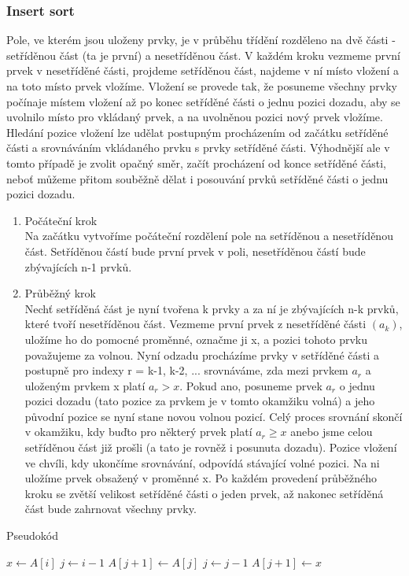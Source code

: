 \documentclass[10pt,a4paper]{article}
\begin{document}
\subsubsection{Insert sort}
Pole, ve kterém jsou uloženy prvky, je v průběhu třídění rozděleno na dvě části - setříděnou část (ta je první) a nesetříděnou část. V každém kroku vezmeme první prvek v nesetříděné části, projdeme setříděnou část, najdeme v ní místo vložení a na toto místo prvek vložíme. Vložení se provede tak, že posuneme všechny prvky počínaje místem vložení až po konec setříděné části o jednu pozici dozadu, aby se uvolnilo místo pro vkládaný prvek, a na uvolněnou pozici nový prvek vložíme. Hledání pozice vložení lze udělat postupným procházením od začátku setříděné části a srovnáváním vkládaného prvku s prvky setříděné části. Výhodnější ale v tomto případě je zvolit opačný směr, začít procházení od konce setříděné části, neboť můžeme přitom souběžně dělat i posouvání prvků setříděné části o jednu pozici dozadu.
\begin{enumerate}
	\item Počáteční krok \\
	Na začátku vytvoříme počáteční rozdělení pole na setříděnou a nesetříděnou část. Setříděnou částí bude první prvek v poli, nesetříděnou částí bude zbývajících n-1 prvků.
	\item Průběžný krok \\
	Nechť setříděná část je nyní tvořena k prvky a za ní je zbývajících n-k prvků, které tvoří nesetříděnou část. Vezmeme první prvek z nesetříděné části $(a_k)$, uložíme ho do pomocné proměnné, označme ji x, a pozici tohoto prvku považujeme za volnou. Nyní odzadu procházíme prvky v setříděné části a postupně pro indexy r = k-1, k-2, ... srovnáváme, zda mezi prvkem $a_r$ a uloženým prvkem x platí $a_r > x$. Pokud ano, posuneme prvek $a_r$ o jednu pozici dozadu (tato pozice za prvkem je v tomto okamžiku volná) a jeho původní pozice se nyní stane novou volnou pozicí. Celý proces srovnání skončí v okamžiku, kdy buďto pro některý prvek platí $a_r \geq x$ anebo jsme celou setříděnou část již prošli (a tato je rovněž i posunuta dozadu). Pozice vložení ve chvíli, kdy ukončíme srovnávání, odpovídá stávající volné pozici. Na ni uložíme prvek obsažený v proměnné x. Po každém provedení průběžného kroku se zvětší velikost setříděné části o jeden prvek, až nakonec setříděná část bude zahrnovat všechny prvky.
\end{enumerate}
\begin{algorithm}
\caption{Pseudokód}
\begin{algorithmic}[]
	\State $x \gets A[i]$
	\State $j \gets i-1$
		\State $A[j+1] \gets A[j]$
		\State $j \gets j-1$
	\EndWhile
	\State $A[j+1] \gets x$
\EndFor
\EndProcedure
\end{algorithmic}
\end{algorithm}
\end{document}
